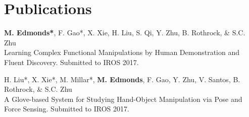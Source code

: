 \documentclass[letterpaper]{deedy-resume} %
\begin{document}
\begin{minipage}[t]{0.66\textwidth}
\sectionspace %



\section{Publications} 


{\bf M. Edmonds*}, F. Gao*, X. Xie, H. Liu, S. Qi, Y. Zhu, B. Rothrock, \& S.C. Zhu\\
Learning Complex Functional Manipulations by Human Demonstration and Fluent Discovery. Submitted to IROS 2017.

\vspace{5pt}

H. Liu*, X. Xie*, M. Millar*, {\bf M. Edmonds}, F. Gao, Y. Zhu, V. Santos, B. Rothrock, \& S.C. Zhu \\
A Glove-based System for Studying Hand-Object Manipulation via Pose and Force Sensing. Submitted to IROS 2017.


\end{minipage}
\end{document}
